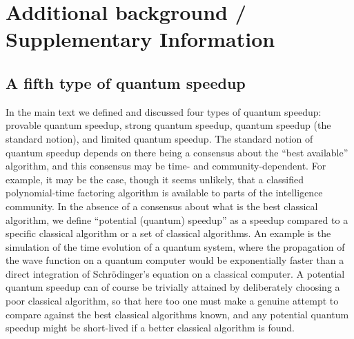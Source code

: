 %
%
% 
%
%

\section{Additional background / Supplementary Information}

\subsection{A fifth type of quantum speedup}
In the main text we defined and discussed four types of quantum speedup: provable quantum speedup, strong quantum speedup, quantum speedup (the standard notion), and limited quantum speedup. The standard notion of quantum speedup depends on there being a consensus about the ``best available'' algorithm, and this consensus may be time- and community-dependent. For example, it may be the case, though it seems unlikely, that a classified polynomial-time factoring algorithm is available to parts of the intelligence community. In the absence of a consensus about what is the best classical algorithm, we define ``potential (quantum) speedup'' as a speedup compared to a specific classical algorithm or a set of classical algorithms. An example is the simulation of the time evolution of a quantum system, where the propagation of the wave function on a quantum computer would be exponentially faster than a direct integration of  Schr\"odinger's equation on a classical computer. A potential quantum speedup can of course be trivially attained by deliberately choosing a poor classical algorithm, so that here too one must make a genuine attempt to compare against the best classical algorithms known, and any potential quantum speedup might be short-lived if a better classical algorithm is found.

